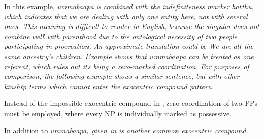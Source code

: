 In this example, \em ummabaapa \em is combined with the indefiniteness marker \em hatthu\em, which indicates that we are dealing with only one entity here, not with several ones. This meaning is difficult to render in English, because the singular does not combine well with parenthood due to the ontological necessity of two people participating in procreation. An approximate translation could be \em We are all the same ancestry's children. \em Example  shows that \em ummabaapa \em can be treated as one referent, which rules out its being a zero-marked coordination. For purposes of comparison, the following example shows a similar sentence, but with other kinship terms which cannot enter the exocentric compound pattern.



Instead of the impossible exocentric compound in , zero coordination of two PPs must be employed, where every NP is individually marked as possessive.



In addition to \em ummabaapa, \em {} given in  is another common exocentric compound.



